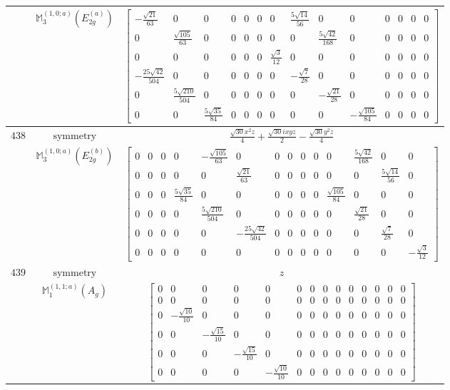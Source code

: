\documentclass[fleqn,8pt,landscape]{jsarticle}
\begin{document}
\begin{longtable}{ccc}
$  $ & $ \mathbb{M}_{3}^{(1,0;a)}(E_{2g}^{(a)}) $ & $ \begin{bmatrix} - \frac{\sqrt{21}}{63} & 0 & 0 & 0 & 0 & 0 & 0 & \frac{5 \sqrt{14}}{56} & 0 & 0 & 0 & 0 & 0 & 0 \\ 0 & \frac{\sqrt{105}}{63} & 0 & 0 & 0 & 0 & 0 & 0 & \frac{5 \sqrt{42}}{168} & 0 & 0 & 0 & 0 & 0 \\ 0 & 0 & 0 & 0 & 0 & 0 & \frac{\sqrt{3}}{12} & 0 & 0 & 0 & 0 & 0 & 0 & 0 \\ - \frac{25 \sqrt{42}}{504} & 0 & 0 & 0 & 0 & 0 & 0 & - \frac{\sqrt{7}}{28} & 0 & 0 & 0 & 0 & 0 & 0 \\ 0 & \frac{5 \sqrt{210}}{504} & 0 & 0 & 0 & 0 & 0 & 0 & - \frac{\sqrt{21}}{28} & 0 & 0 & 0 & 0 & 0 \\ 0 & 0 & \frac{5 \sqrt{35}}{84} & 0 & 0 & 0 & 0 & 0 & 0 & - \frac{\sqrt{105}}{84} & 0 & 0 & 0 & 0 \end{bmatrix} $ \\ \hline
$ 438 $ & $ \text{symmetry} $ & $ \frac{\sqrt{30} x^{2} z}{4} + \frac{\sqrt{30} i x y z}{2} - \frac{\sqrt{30} y^{2} z}{4} $ \\
$  $ & $ \mathbb{M}_{3}^{(1,0;a)}(E_{2g}^{(b)}) $ & $ \begin{bmatrix} 0 & 0 & 0 & 0 & - \frac{\sqrt{105}}{63} & 0 & 0 & 0 & 0 & 0 & 0 & \frac{5 \sqrt{42}}{168} & 0 & 0 \\ 0 & 0 & 0 & 0 & 0 & \frac{\sqrt{21}}{63} & 0 & 0 & 0 & 0 & 0 & 0 & \frac{5 \sqrt{14}}{56} & 0 \\ 0 & 0 & 0 & \frac{5 \sqrt{35}}{84} & 0 & 0 & 0 & 0 & 0 & 0 & \frac{\sqrt{105}}{84} & 0 & 0 & 0 \\ 0 & 0 & 0 & 0 & \frac{5 \sqrt{210}}{504} & 0 & 0 & 0 & 0 & 0 & 0 & \frac{\sqrt{21}}{28} & 0 & 0 \\ 0 & 0 & 0 & 0 & 0 & - \frac{25 \sqrt{42}}{504} & 0 & 0 & 0 & 0 & 0 & 0 & \frac{\sqrt{7}}{28} & 0 \\ 0 & 0 & 0 & 0 & 0 & 0 & 0 & 0 & 0 & 0 & 0 & 0 & 0 & - \frac{\sqrt{3}}{12} \end{bmatrix} $ \\ \hline
$ 439 $ & $ \text{symmetry} $ & $ z $ \\
$  $ & $ \mathbb{M}_{1}^{(1,1;a)}(A_{g}) $ & $ \begin{bmatrix} 0 & 0 & 0 & 0 & 0 & 0 & 0 & 0 & 0 & 0 & 0 & 0 & 0 & 0 \\ 0 & 0 & 0 & 0 & 0 & 0 & 0 & 0 & 0 & 0 & 0 & 0 & 0 & 0 \\ 0 & - \frac{\sqrt{10}}{10} & 0 & 0 & 0 & 0 & 0 & 0 & 0 & 0 & 0 & 0 & 0 & 0 \\ 0 & 0 & - \frac{\sqrt{15}}{10} & 0 & 0 & 0 & 0 & 0 & 0 & 0 & 0 & 0 & 0 & 0 \\ 0 & 0 & 0 & - \frac{\sqrt{15}}{10} & 0 & 0 & 0 & 0 & 0 & 0 & 0 & 0 & 0 & 0 \\ 0 & 0 & 0 & 0 & - \frac{\sqrt{10}}{10} & 0 & 0 & 0 & 0 & 0 & 0 & 0 & 0 & 0 \end{bmatrix} $ \\ \hline

\end{longtable}
\end{document}
